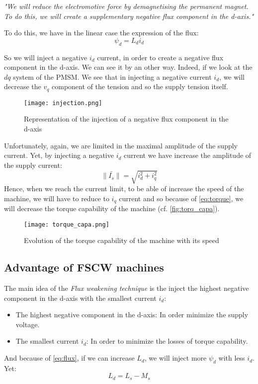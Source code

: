 \textit{"We will reduce the electromotive force by demagnetising the permanent magnet. To do this, we will create a supplementary negative flux component in the d-axis."}

To do this, we have in the linear case the expression of the flux:
\begin{equation}\label{eq:flux}
    \psi_d = L_d i_d
\end{equation}

So we will inject a negative $i_d$ current, in order to create a negative flux component in the d-axis. We can see it by an other way. Indeed, if we look at the $dq$ system of the PMSM. We see that in injecting a negative current $i_d$, we will decrease the $v_q$ component of the tension and so the supply tension itself.

\begin{figure}[H]
    \centering
    \texttt{[image: injection.png]}
    \caption{Representation of the injection of a negative flux component in the d-axis}
    \label{fig:injection}
\end{figure}

Unfortunately, again, we are limited in the maximal amplitude of the supply current. Yet, by injecting a negative $i_d$ current we have increase the amplitude of the supply current:
\begin{equation}
    \|\bar{I_s}\| =  \sqrt{i_d^2 + i_q^2}
\end{equation}
Hence, when we reach the current limit, to be able of increase the speed of the machine, we will have to reduce to $i_q$ current and so because of \autoref{eq:torque}, we will decrease the torque capability of the machine (cf. \autoref{fig:torq_capa}).

\begin{figure}[H]
    \centering
    \texttt{[image: torque\_capa.png]}
    \caption{Evolution of the torque capability of the machine with its speed}
    \label{fig:torq_capa}
\end{figure}

\subsection{Advantage of FSCW machines}

The main idea of the \textit{Flux weakening technique} is the inject the highest negative component in the d-axis with the smallest current $i_d$:
\begin{itemize}
    \item The highest negative component in the d-axis: In order minimize the supply voltage.
    \item The smallest current $i_d$: In order to minimize the losses of torque capability. 
\end{itemize}
And because of \autoref{eq:flux}, if we can increase $L_d$, we will inject more $\psi_d$ with less $i_d$. Yet:
\begin{equation}
    L_d = L_s - M_s
\end{equation}

